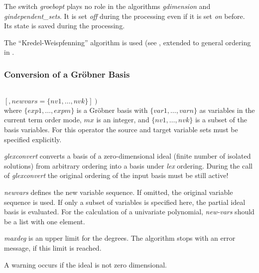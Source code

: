 The switch \emph{groebopt} plays no role in the algorithms \emph{gdimension} and
\emph{gindependent\_sets}. It is set \emph{off} during the processing even if
it is set \emph{on} before. Its state is saved during the processing.

The ``Kredel-Weispfenning'' algorithm is used (see \cite{Kredel:88a},
extended to general ordering in \cite{Becker:93}.

\subsubsection{Conversion of a Gr\"obner Basis}

\begin{description}
\item[{{\it glexconvert}$\left(\{exp,\ldots , expm\} \left[,\{var1
\ldots , varn\}\right]\left[,maxdeg=mx\right]\right.$}]\mbox{}\\
$\left.\left[,newvars=\{nv1, \ldots , nvk\}\right]\right)$ \\
where $\{exp1, \ldots , expm\}$ is a Gr\"obner basis with
$\{var1, \ldots , varn\}$ as variables in the current term order mode,
$mx$ is an integer, and
$\{nv1, \ldots , nvk\}$ is a subset of the basis variables.
For this operator the source and target variable sets must be specified
explicitly.
\end{description}

\emph{glexconvert} converts a basis of a zero-dimensional ideal (finite number
of isolated solutions) from arbitrary ordering into a basis under {\it
lex} ordering. During the call of \emph{glexconvert} the original ordering of
the input basis must be still active!

\emph{newvars} defines the new variable sequence. If omitted, the
original variable sequence is used. If only a subset of variables is
specified here, the partial ideal basis is evaluated. For the
calculation of a univariate polynomial, \emph{new-vars} should be a list
with one element.

\emph{maxdeg} is an upper limit for the degrees. The algorithm stops with
an error message, if this limit is reached.

A warning occurs if the ideal is not zero dimensional.

